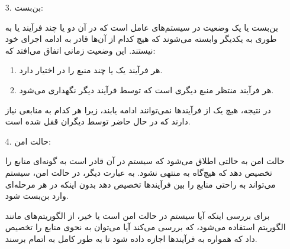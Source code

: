 \begin{enumerate}
	\item [3. ]
	بن‌بست:
	\begin{qsolve}
		بن‌بست یا  یک وضعیت در سیستم‌های عامل است که در آن دو یا چند فرآیند یا  به طوری به یکدیگر وابسته می‌شوند که هیچ کدام از آن‌ها قادر به ادامه اجرای خود نیستند. این وضعیت زمانی اتفاق می‌افتد که:
		\begin{enumerate}
			\item 
			هر فرآیند یک یا چند منبع را در اختیار دارد.
			
			\item 
			هر فرآیند منتظر منبع دیگری است که توسط فرآیند دیگر نگهداری می‌شود.
		\end{enumerate}
		
		در نتیجه، هیچ یک از فرآیندها نمی‌توانند ادامه یابند، زیرا هر کدام به منابعی نیاز دارند که در حال حاضر توسط دیگران قفل شده است.
	\end{qsolve}
	
	
	
	
	
	\item [4. ]
	حالت امن:
	\begin{qsolve}
		حالت امن  به حالتی اطلاق می‌شود که سیستم در آن قادر است به گونه‌ای منابع را تخصیص دهد که هیچ‌گاه به  منتهی نشود. به عبارت دیگر، در حالت امن، سیستم می‌تواند به راحتی منابع را بین فرآیندها تخصیص دهد بدون اینکه در هر مرحله‌ای وارد بن‌بست شود.
		
		برای بررسی اینکه آیا سیستم در حالت امن است یا خیر، از الگوریتم‌های مانند الگوریتم  استفاده می‌شود، که بررسی می‌کند آیا می‌توان به نحوی منابع را تخصیص داد که همواره به فرآیندها اجازه داده شود تا به طور کامل به اتمام برسند.
	\end{qsolve}
\end{enumerate}



